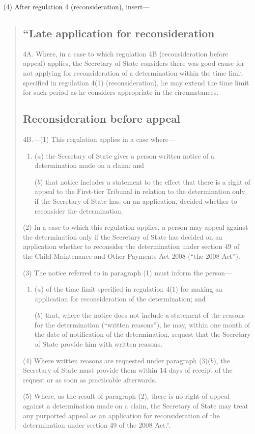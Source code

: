\documentclass[12pt,a4paper]{article}
\begin{document}
(4) After regulation 4 (reconsideration), insert—
\begin{quotation}
\subsection*{“Late application for reconsideration}

4A.  Where, in a case to which regulation 4B (reconsideration before appeal) applies, the Secretary of State considers there was good cause for not applying for reconsideration of a determination within the time limit specified in regulation 4(1) (reconsideration), he may extend the time limit for such period as he considers appropriate in the circumstances.

\subsection*{Reconsideration before appeal}

4B.---(1)  This regulation applies in a case where—
\begin{enumerate}\item[]
($a$) the Secretary of State gives a person written notice of a determination made on a claim; and

($b$) that notice includes a statement to the effect that there is a right of appeal to the First-tier Tribunal in relation to the determination only if the Secretary of State has, on an application, decided whether to reconsider the determination.
\end{enumerate}

(2) In a case to which this regulation applies, a person may appeal against the determination only if the Secretary of State has decided on an application whether to reconsider the determination under section 49 of the Child Maintenance and Other Payments Act 2008 (“the 2008 Act”).

(3) The notice referred to in paragraph (1) must inform the person—
\begin{enumerate}\item[]
($a$) of the time limit specified in regulation 4(1) for making an application for reconsideration of the determination; and

($b$) that, where the notice does not include a statement of the reasons for the determination (“written reasons”), he may, within one month of the date of notification of the determination, request that the Secretary of State provide him with written reasons.
\end{enumerate}

(4) Where written reasons are requested under paragraph (3)($b$), the Secretary of State must provide them within 14 days of receipt of the request or as soon as practicable afterwards.

(5) Where, as the result of paragraph (2), there is no right of appeal against a determination made on a claim, the Secretary of State may treat any purported appeal as an application for reconsideration of the determination under section 49 of the 2008 Act.”.\end{quotation}
\end{document}
